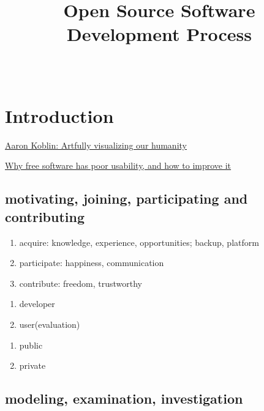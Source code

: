 \documentclass[draftclsnofoot,journal,onecolumn,12pt]{IEEEtran}
\begin{document}
\title{Open Source Software Development Process}

\author{ \\
}

\maketitle
%

\section{Introduction}

\href{http://www.ted.com/talks/aaron_koblin.html}{Aaron Koblin: Artfully visualizing our humanity}

\href{http://www.mpt.net.nz/2012/06/why-free-software-has-poor-usability/}{Why free software has poor usability, and how to improve it}

\subsection{motivating, joining, participating and contributing}

\begin{enumerate}
  \item acquire: knowledge, experience, opportunities; backup, platform
  \item participate: happiness, communication
  \item contribute: freedom, trustworthy
\end{enumerate}

\begin{enumerate}
  \item developer
  \item user(evaluation)
\end{enumerate}

\begin{enumerate}
  \item public
  \item private
\end{enumerate}

\subsection{modeling, examination, investigation}
\end{document}
